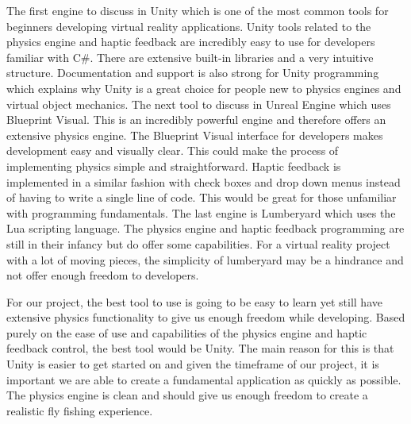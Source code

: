 \documentclass[10pt,journal,compsoc,onecolumn, draftclsnofoot]{IEEEtran}
\begin{document}
The first engine to discuss in Unity which is one of the most common tools for beginners developing virtual reality applications.
Unity tools related to the physics engine and haptic feedback are incredibly easy to use for developers familiar with C\#.
There are extensive built-in libraries and a very intuitive structure\cite{unity_getting_started}.
Documentation and support is also strong for Unity programming which explains why Unity is a great choice for people new to physics engines and virtual object mechanics.
The next tool to discuss in Unreal Engine which uses Blueprint Visual.
This is an incredibly powerful engine and therefore offers an extensive physics engine\cite{unreal_editor_manual}.
The Blueprint Visual interface for developers makes development easy and visually clear.
This could make the process of implementing physics simple and straightforward.
Haptic feedback is implemented in a similar fashion with check boxes and drop down menus instead of having to write a single line of code.
This would be great for those unfamiliar with programming fundamentals.
The last engine is Lumberyard which uses the Lua scripting language.
The physics engine and haptic feedback programming are still in their infancy but do offer some capabilities\cite{lumberyard_object_system}.
For a virtual reality project with a lot of moving pieces, the simplicity of lumberyard may be a hindrance and not offer enough freedom to developers.

For our project, the best tool to use is going to be easy to learn yet still have extensive physics functionality to give us enough freedom while developing.
Based purely on the ease of use and capabilities of the physics engine and haptic feedback control, the best tool would be Unity.
The main reason for this is that Unity is easier to get started on and given the timeframe of our project, it is important we are able to create a fundamental application as quickly as possible.
The physics engine is clean and should give us enough freedom to create a realistic fly fishing experience.
\vspace{2mm}
\end{document}
